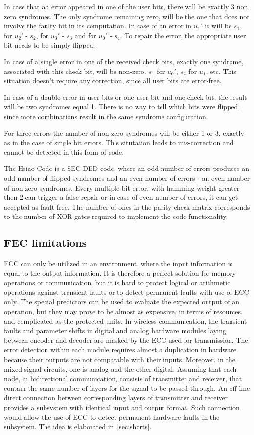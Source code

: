 In case that an error appeared in one of the user bits, there will be exactly 3 non zero syndromes. The only syndrome remaining zero, will be the one that does not involve the faulty bit in its computation. In case of an error in $u_1'$ it will be $s_1$, for $u_2'$ - $s_2$, for $u_3'$ - $s_3$ and for $u_0'$ - $s_4$. To repair the error, the appropriate user bit needs to be simply flipped.

In case of a single error in one of the received check bits, exactly one syndrome, associated with this check bit, will be non-zero. $s_1$ for $u_0'$, $s_2$ for $u_1$, etc. This situation doesn't require any correction, since all user bits are error-free. 

In case of a double error in user bits or one user bit and one check bit, the result will be two syndromes equal 1. There is no way to tell which bits were flipped, since more combinations result in the same syndrome configuration.

For three errors the number of non-zero syndromes will be either 1 or 3, exactly as in the case of single bit errors. This situtation leads to mis-correction and cannot be detected in this form of code.

The Hsiao Code is a SEC-DED code, where an odd number of errors produces an odd number of flipped syndromes and an even number of errors - an even number of non-zero syndromes. Every multiple-bit error, with hamming weight greater then 2 can trigger a false repair or in case of even number of errors, it can get accepted as fault free. The number of ones in the parity check matrix corresponds to the number of XOR gates required to implement the code functionality. 


\subsection{FEC limitations}\label{sub:limits}
ECC can only be utilized in an environment, where the input information is equal to the output information. It is therefore a perfect solution for memory operations or communication, but it is hard to protect logical or arithmetic operations against transient faults or to detect permanent faults with use of ECC only. The special predictors can be used to evaluate the expected output of an operation, but they may prove to be almost as expensive, in terms of resources, and complicated as the protected units. In wireless communication, the transient faults and parameter shifts in digital and analog hardware modules laying between encoder and decoder are masked by the ECC used for transmission. The error detection within each module requires almost a duplication in hardware because their outputs are not comparable with their inputs. Moreover, in the mixed signal circuits, one is analog and the other digital. Assuming that each node, in bidirectional communication, consists of transmitter and receiver, that contain the same number of layers for the signal to be passed through. An off-line direct connection between corresponding layers of transmitter and receiver provides a subsystem with identical input and output format. Such connection would allow the use of ECC to detect permanent hardware faults in the subsystem. The idea is elaborated in~\autoref{sec:shorts}.

